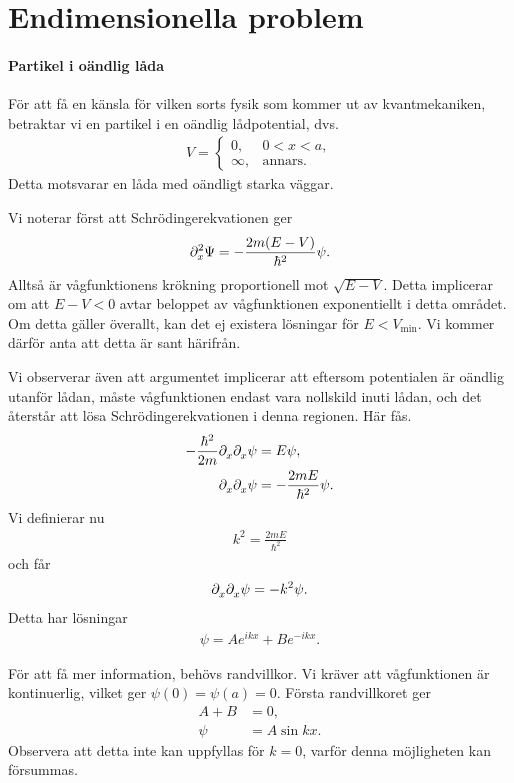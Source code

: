 \section{Endimensionella problem}

\paragraph{Partikel i oändlig låda}
För att få en känsla för vilken sorts fysik som kommer ut av kvantmekaniken, betraktar vi en partikel i en oändlig lådpotential, dvs.
\begin{align*}
	V = 
	\begin{cases}
		0,      &0 < x < a, \\
		\infty, &\text{annars.}
	\end{cases}
\end{align*}
Detta motsvarar en låda med oändligt starka väggar.

Vi noterar först att Schrödingerekvationen ger
\begin{align*}
	\del[2]{x}{\Psi} = -\frac{2m(E - V)}{\hbar^{2}}\psi.
\end{align*}
Alltså är vågfunktionens krökning proportionell mot $\sqrt{E - V}$. Detta implicerar om att $E - V < 0$ avtar beloppet av vågfunktionen exponentiellt i detta området. Om detta gäller överallt, kan det ej existera lösningar för $E < V_{\text{min}}$. Vi kommer därför anta att detta är sant härifrån.

Vi observerar även att argumentet implicerar att eftersom potentialen är oändlig utanför lådan, måste vågfunktionen endast vara nollskild inuti lådan, och det återstår att lösa Schrödingerekvationen i denna regionen. Här fås.
\begin{align*}
	-\frac{\hbar^{2}}{2m}\del{x}{\del{x}{\psi}} &= E\psi, \\
	\del{x}{\del{x}{\psi}}                      &= -\frac{2mE}{\hbar^{2}}\psi.
\end{align*}
Vi definierar nu
\begin{align*}
	k^{2} = \frac{2mE}{\hbar^{2}}
\end{align*}
och får
\begin{align*}
	\del{x}{\del{x}{\psi}} = -k^{2}\psi.
\end{align*}
Detta har lösningar
\begin{align*}
	\psi = Ae^{ikx} + Be^{-ikx}.
\end{align*}

För att få mer information, behövs randvillkor. Vi kräver att vågfunktionen är kontinuerlig, vilket ger $\psi(0) = \psi(a) = 0$. Första randvillkoret ger
\begin{align*}
 	A + B &= 0, \\
 	\psi  &= A\sin{kx}.
\end{align*}
Observera att detta inte kan uppfyllas för $k = 0$, varför denna möjligheten kan försummas.

